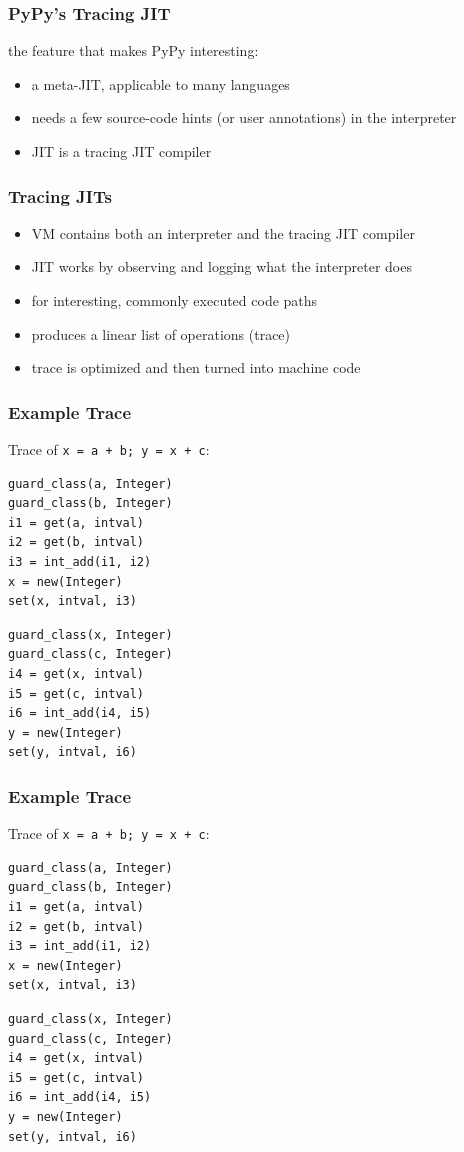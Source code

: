 \documentclass[utf8x]{beamer}
\begin{document}
\begin{frame}
  \frametitle{PyPy's Tracing JIT}
  the feature that makes PyPy interesting:
  \begin{itemize}
      \item a meta-JIT, applicable to many languages
      \item needs a few source-code hints (or user annotations) in the interpreter
      \item JIT is a tracing JIT compiler
  \end{itemize}
\end{frame}

\begin{frame}
  \frametitle{Tracing JITs}
  \begin{itemize}
      \item VM contains both an interpreter and the tracing JIT compiler
      \item JIT works by observing and logging what the interpreter does
      \item for interesting, commonly executed code paths
      \item produces a linear list of operations (trace)
      \item trace is optimized and then turned into machine code
  \end{itemize}
\end{frame}

\begin{frame}[containsverbatim]
  \frametitle{Example Trace}
  Trace of \texttt{x = a + b; y = x + c}:
\begin{verbatim}
guard_class(a, Integer)
guard_class(b, Integer)
i1 = get(a, intval)
i2 = get(b, intval)
i3 = int_add(i1, i2)
x = new(Integer)
set(x, intval, i3)
\end{verbatim}
\pause
\begin{verbatim}
guard_class(x, Integer)
guard_class(c, Integer)
i4 = get(x, intval)
i5 = get(c, intval)
i6 = int_add(i4, i5)
y = new(Integer)
set(y, intval, i6)
\end{verbatim}
\end{frame}

\begin{frame}[containsverbatim]
  \frametitle{Example Trace}
  Trace of \texttt{x = a + b; y = x + c}:
\begin{verbatim}
guard_class(a, Integer)
guard_class(b, Integer)
i1 = get(a, intval)
i2 = get(b, intval)
i3 = int_add(i1, i2)
x = new(Integer)
set(x, intval, i3)
\end{verbatim}
\begin{verbatim}
guard_class(x, Integer)
guard_class(c, Integer)
i4 = get(x, intval)
i5 = get(c, intval)
i6 = int_add(i4, i5)
y = new(Integer)
set(y, intval, i6)
\end{verbatim}
\end{frame}
\end{document}
